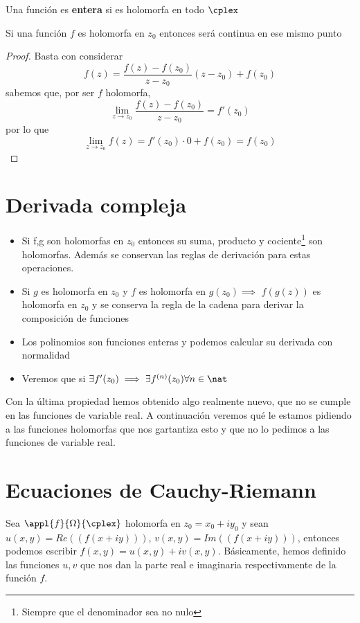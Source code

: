 \documentclass{apuntes}
\begin{document}
\begin{defn}
Una función es \textbf{entera} si es holomorfa en todo $\cplex$
\end{defn}

\begin{prop}
Si una función $f$ es holomorfa en $z_0$ entonces será continua en ese mismo punto
\end{prop}
\begin{proof}
Basta con considerar
\[f(z)=\frac{f(z)-f(z_0)}{z-z_0}(z-z_0)+f(z_0)\]
sabemos que, por ser $f$ holomorfa,
\[\lim_{z \to z_0}\frac{f(z)-f(z_0)}{z-z_0} = f'(z_0)\]
por lo que
\[\lim_{z \to z_0} f(z) = f'(z_0)\cdot0+f(z_0)=f(z_0)\]
\end{proof}

\section{Derivada compleja}
\begin{itemize}
\item Si f,g son holomorfas en $z_0$ entonces su suma, producto y cociente\footnote{Siempre que el denominador sea no nulo} son holomorfas. Además se conservan las reglas de derivación para estas operaciones.

\item Si $g$ es holomorfa en $z_0$ y $f$ es holomorfa en $g(z_0) \implies$ $f(g(z))$ es holomorfa en $z_0$ y se conserva la regla de la cadena para derivar la composición de funciones

\item Los polinomios son funciones enteras y podemos calcular su derivada con normalidad

\item Veremos que si $\exists f'(z_0) \implies \exists f^{(n)}(z_0) \forall n \in \nat$
\end{itemize}

Con la última propiedad hemos obtenido algo realmente nuevo, que no se cumple en las funciones de variable real. A continuación veremos qué le estamos pidiendo a las funciones holomorfas que nos gartantiza esto y que no lo pedimos a las funciones de variable real.


\section{Ecuaciones de Cauchy-Riemann}
Sea $\appl{f}{\Omega}{\cplex}$ holomorfa en $z_0=x_0+iy_0$ y sean $u(x,y)=Re((f(x+iy)))$, $v(x,y)=Im((f(x+iy)))$, entonces podemos escribir $f(x,y)=u(x,y)+iv(x,y)$. Básicamente, hemos definido las funciones $u,v$ que nos dan la parte real e imaginaria respectivamente de la función $f$.
\end{document}
